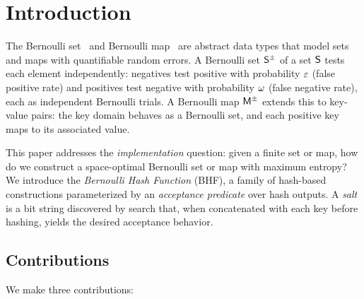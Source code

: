 \section{Introduction}
\label{sec:intro}

The Bernoulli set~\cite{bernoulli_sets} and Bernoulli map~\cite{bernoulli_maps}
are abstract data types that model sets and maps with quantifiable random errors.
A Bernoulli set $\ASet{S}$ of a set $\Set{S}$ tests each element independently:
negatives test positive with probability $\varepsilon$ (false positive rate) and
positives test negative with probability $\omega$ (false negative rate), each as
independent Bernoulli trials.
A Bernoulli map $\ASet{M}$ extends this to key-value pairs: the key domain
behaves as a Bernoulli set, and each positive key maps to its associated value.

This paper addresses the \emph{implementation} question: given a finite set or
map, how do we construct a space-optimal Bernoulli set or map with maximum
entropy?
We introduce the \emph{Bernoulli Hash Function} (BHF), a family of hash-based
constructions parameterized by an \emph{acceptance predicate} over hash
outputs.
A \emph{salt} is a bit string discovered by search that, when concatenated
with each key before hashing, yields the desired acceptance behavior.

\subsection*{Contributions}

We make three contributions:

